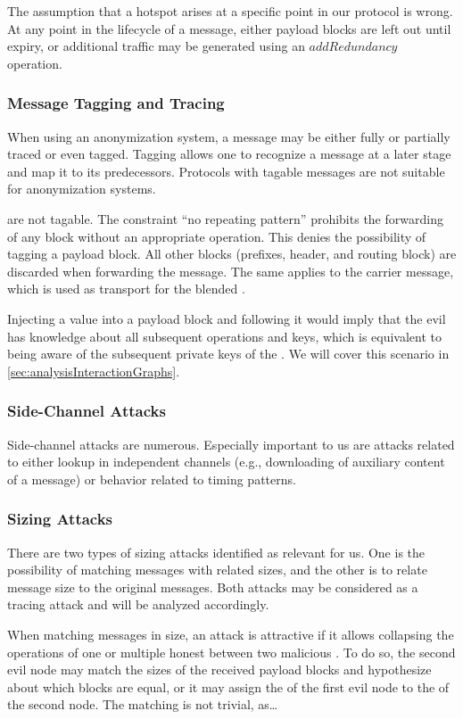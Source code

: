 The assumption that a hotspot arises at a specific point in our protocol is wrong. At any point in the lifecycle of a message, either payload blocks are left out until expiry, or additional traffic may be generated using an $addRedundancy$ operation.

\subsubsection{Message Tagging and Tracing}
When using an anonymization system, a message may be either fully or partially traced or even tagged. Tagging allows one to recognize a message at a later stage and map it to its predecessors. Protocols with tagable messages are not suitable for anonymization systems.

\VortexMessages{} are not tagable. The constraint ``no repeating pattern'' prohibits the forwarding of any block without an appropriate operation. This denies the possibility of tagging a payload block. All other blocks (prefixes, header, and routing block) are discarded when forwarding the message. The same applies to the carrier message, which is used as transport for the blended \VortexMessage.

Injecting a value into a payload block and following it would imply that the evil \VortexNode{} has knowledge about all subsequent operations and keys, which is equivalent to being aware of the subsequent private keys of the \VortexNodes. We will cover this scenario in \cref{sec:analysisInteractionGraphs}.

\subsubsection{Side-Channel Attacks}
Side-channel attacks are numerous. Especially important to us are attacks related to either lookup in independent channels (e.g., downloading of auxiliary content of a message) or behavior related to timing patterns.

\subsubsection{Sizing Attacks}
There are two types of sizing attacks identified as relevant for us. One is the possibility of matching messages with related sizes, and the other is to relate message size to the original messages. Both attacks may be considered as a tracing attack and will be analyzed accordingly. 

When matching messages in size, an attack is attractive if it allows collapsing the operations of one or multiple honest \VortexNodes{} between two malicious \VortexNodes. To do so, the second evil node may match the sizes of the received payload blocks and hypothesize about which blocks are equal, or it may assign the  of the first evil node to the  of the second node. The matching is not trivial, as\ldots

